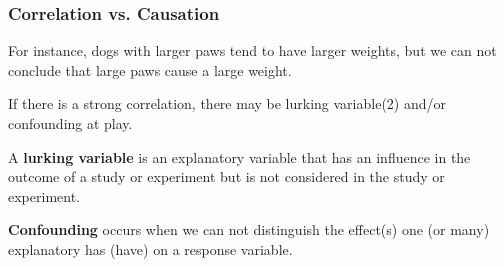 \documentclass{article}
\begin{document}
\vfill 

\newpage 

\subsubsection*{Correlation vs. Causation}
\vspace{0.5in}

\begin{center}
\end{center}

\vspace{1in}

For instance, dogs with larger paws tend to have larger weights, but we can not conclude that large paws cause a large weight.
\vspace{0.5in}

If there is a strong correlation, there may be lurking variable(2) and/or confounding at play.

\vspace{0.5in}

\begin{tcolorbox}[colframe=green!20!black, colback = green!30!white,title=\textbf{Lurking Variable}]
A \textbf{lurking variable} is an explanatory variable that has an influence in the outcome of a study or experiment but is not considered in the study or experiment.
\end{tcolorbox}

\vspace{1in}

\begin{tcolorbox}[colframe=green!20!black, colback = green!30!white,title=\textbf{Confounding}]
\textbf{Confounding} occurs when we can not distinguish the effect(s) one (or many) explanatory has (have) on a response variable.
\end{tcolorbox}
\end{document}
